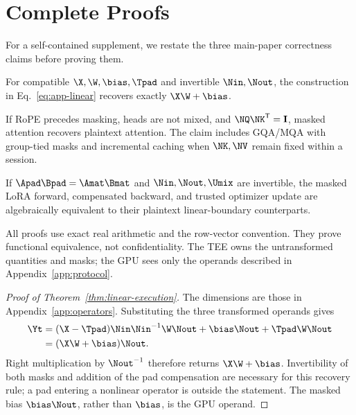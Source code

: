 \section{Complete Proofs}
\label{app:proofs}

For a self-contained supplement, we restate the three main-paper correctness
claims before proving them.

\begin{theorem}\label{thm:linear-execution}
For compatible $\X,\W,\bias,\Tpad$ and invertible $\Nin,\Nout$, the
construction in Eq.~\eqref{eq:app-linear} recovers exactly $\X\W+\bias$.
\end{theorem}

\begin{theorem}\label{thm:attention-cache}
If RoPE precedes masking, heads are not mixed, and
$\NQ\NK^{\mathsf T}=\mathbf I$, masked attention recovers plaintext attention.
The claim includes GQA/MQA with group-tied masks and incremental caching when
$\NK,\NV$ remain fixed within a session.
\end{theorem}

\begin{theorem}\label{thm:lora-equivalence}
If $\Apad\Bpad=\Amat\Bmat$ and $\Nin,\Nout,\Umix$ are invertible, the masked
LoRA forward, compensated backward, and trusted optimizer update are
algebraically equivalent to their plaintext linear-boundary counterparts.
\end{theorem}

All proofs use exact real arithmetic and the row-vector convention.  They prove
functional equivalence, not confidentiality.  The TEE owns the untransformed
quantities and masks; the GPU sees only the operands described in
Appendix~\ref{app:protocol}.

\begin{proof}[Proof of Theorem~\ref{thm:linear-execution}]
The dimensions are those in Appendix~\ref{app:operators}.  Substituting the
three transformed operands gives
\begin{align}
\Yt
&=(\X-\Tpad)\Nin\Nin^{-1}\W\Nout
  +\bias\Nout+\Tpad\W\Nout\nonumber\\
&=(\X\W+\bias)\Nout.
\end{align}
Right multiplication by $\Nout^{-1}$ therefore returns $\X\W+\bias$.
Invertibility of both masks and addition of the pad compensation are necessary
for this recovery rule; a pad entering a nonlinear operator is outside the
statement.  The masked bias $\bias\Nout$, rather than $\bias$, is the GPU
operand.
\end{proof}

